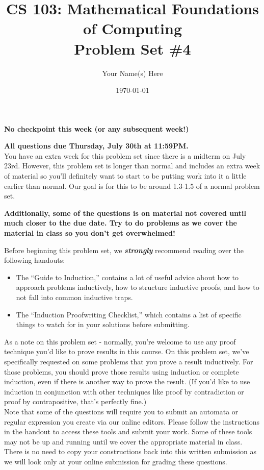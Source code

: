 \documentclass{article}
\title{CS 103: Mathematical Foundations of Computing\\Problem Set \#4}
\author{Your Name(s) Here}
\date{\today}
\renewcommand{\(}{\left(}
\renewcommand{\)}{\right)}
\theoremstyle{plain}
\theoremstyle{plain}
\theoremstyle{definition}
\renewcommand{\emph}[1]{\textit{\textbf{#1}}}
\begin{document}
\maketitle

\textbf{No checkpoint this week (or any subsequent week!)}

\textbf{All questions due Thursday, July 30th at 11:59PM.} \\

You have an extra week for this problem set since there is a midterm on July 23rd. However, this problem set is longer than normal and includes an extra week of material so you'll definitely want to start to be putting work into it a little earlier than normal. Our goal is for this to be around 1.3-1.5 of a normal problem set.

\textbf{Additionally, some of the questions is on material not covered until much closer to the due date. Try to do problems as we cover the material in class so you don't get overwhelmed!}



Before beginning this problem set, we \emph{strongly} recommend reading over the following handouts:
\begin{itemize}
\item The ``Guide to Induction,'' contains a lot of useful advice about how to approach problems inductively, how to structure inductive proofs, and how to not fall into common inductive traps.
\item The ``Induction Proofwriting Checklist,'' which contains a list of specific things to watch for in your solutions before submitting.
\end{itemize}
As a note on this problem set - normally, you're welcome to use any proof technique you'd like to prove results in this course. On this problem set, we've specifically requested on some problems that you prove a result inductively. For those problems, you should prove those results using induction or complete induction, even if there is another way to prove the result. (If you'd like to use induction in conjunction with other techniques like proof by contradiction or proof by contrapositive, that's perfectly fine.) \\

Note that some of the questions will require you to submit an automata or regular expression you create
via our online editors. Please follow the instructions in the handout to access these tools and submit your work. Some of these tools may not be up and running until we cover the appropriate material in class.
There is no need to copy your constructions back into this written submission as we will look only at your
online submission for grading these questions. \\ 
\end{document}
